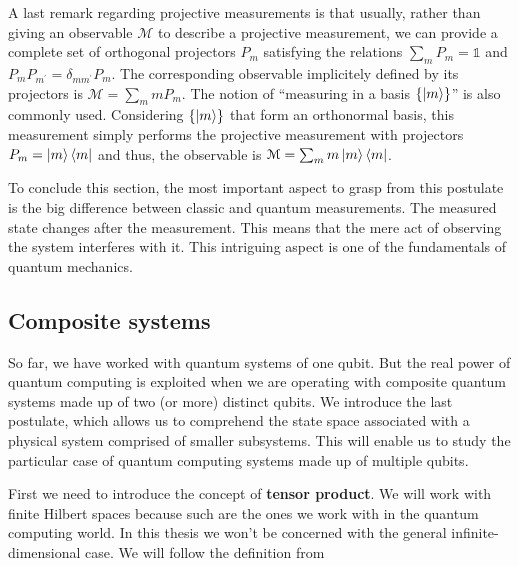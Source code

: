 A last remark regarding projective measurements is that usually, rather than giving an observable $\mathcal{M}$ to describe a projective measurement, we can provide a complete set of orthogonal projectors $P_m$ satisfying the relations $\sum_m P_m = \mathbb{1}$ and $P_m P_{m^\prime} = \delta_{m m^\prime}P_m$. The corresponding observable implicitely defined by its projectors is $\mathcal{M}=\sum_m m P_m$. The notion of ``measuring in a basis $\left \lbrace \ket{m} \right \rbrace$'' is also commonly used. Considering $\left \lbrace \ket{m} \right \rbrace$ that form an orthonormal basis, this measurement simply performs the projective measurement with projectors $P_m=\ket{m}\bra{m}$ and thus, the observable is $\mathcal{M}=\sum_m m \ket{m} \bra{m}$.

To conclude this section, the most important aspect to grasp from this postulate is the big difference between classic and quantum measurements. The measured state changes after the measurement. This means that the mere act of observing the system interferes with it. This intriguing aspect is one of the fundamentals of quantum mechanics.


\subsection{Composite systems}\label{sec: composite systems}

So far, we have worked with quantum systems of one qubit. But the real power of quantum computing is exploited when we are operating with composite quantum systems made up of two (or more) distinct qubits. We introduce the last postulate, which allows us to comprehend the state space associated with a physical system comprised of smaller subsystems. This will enable us to study the particular case of quantum computing systems made up of multiple qubits.

First we need to introduce the concept of \textbf{tensor product}. We will work with finite Hilbert spaces because such are the ones we work with in the quantum computing world. In this thesis we won't be concerned with the general infinite-dimensional case. We will follow the definition from \cite{Scherer_book}

